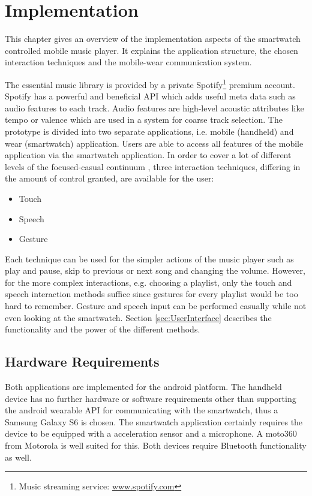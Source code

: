 \chapter{Implementation}\label{ch:implementation}

This chapter gives an overview of the implementation aspects of the smartwatch controlled mobile music player. It explains the application structure, the chosen interaction techniques and the mobile-wear communication system.

The essential music library is provided by a private Spotify\footnote{Music streaming service: \url{www.spotify.com}} premium account. Spotify has a powerful and beneficial \ac{API} which adds useful meta data such as audio features to each track. Audio features are high-level acoustic attributes like tempo or valence which are used in a system for coarse track selection. The prototype is divided into two separate applications, i.e. mobile (handheld) and wear (smartwatch) application. Users are able to access all features of the mobile application via the smartwatch application. In order to cover a lot of different levels of the focused-casual continuum \cite{pohl2013focused}, three interaction techniques, differing in the amount of control granted, are available for the user:
\begin{itemize}
\item{Touch}
\item{Speech}
\item{Gesture}
\end{itemize}
Each technique can be used for the simpler actions of the music player such as play and pause, skip to previous or next song and changing the volume. However, for the more complex interactions, e.g. choosing a playlist, only the touch and speech interaction methods suffice since gestures for every playlist would be too hard to remember. Gesture and speech input can be performed casually while not even looking at the smartwatch. Section \ref{sec:UserInterface} describes the functionality and the power of the different methods.

\section{Hardware Requirements}\label{sec:hardwarerequirements}
Both applications are implemented for the android platform. The handheld device has no further hardware or software requirements other than supporting the android wearable \ac{API} for communicating with the smartwatch, thus a Samsung Galaxy S6 is chosen. The smartwatch application certainly requires the device to be equipped with a acceleration sensor and a microphone. A moto360 from Motorola is well suited for this. Both devices require Bluetooth functionality as well.

